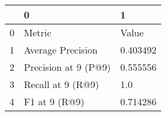 \begin{tabular}{lll}
\toprule
{} &                     0 &         1 \\
\midrule
0 &                Metric &     Value \\
1 &     Average Precision &  0.403492 \\
2 &  Precision at 9 (P@9) &  0.555556 \\
3 &     Recall at 9 (R@9) &       1.0 \\
4 &         F1 at 9 (R@9) &  0.714286 \\
\bottomrule
\end{tabular}

